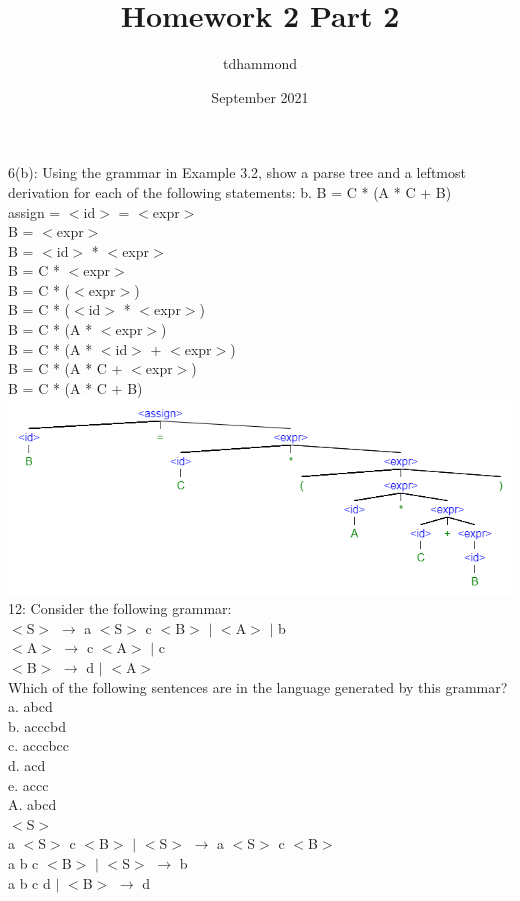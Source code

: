 \documentclass{article}
\title{Homework 2 Part 2}
\author{tdhammond }
\date{September 2021}
\begin{document}
\maketitle

6(b): Using the grammar in Example 3.2, show a parse tree and a leftmost derivation for each of the following statements:
b. B = C * (A * C + B)\\
assign = $<$id$>$ = $<$expr$>$\\
	  B = $<$expr$>$\\
	  B = $<$id$>$ * $<$expr$>$\\
	  B = C * $<$expr$>$\\
	  B = C * ($<$expr$>$)\\
	  B = C * ($<$id$>$ * $<$expr$>$)\\
	  B = C * (A * $<$expr$>$)\\
	  B = C * (A * $<$id$>$ + $<$expr$>$)\\
	  B = C * (A * C + $<$expr$>$)\\
	  B = C * (A * C + B)\\
\includegraphics[scale=.5]{6b.png} \\

12: Consider the following grammar:\\
$<$S$>$ $\rightarrow$ a $<$S$>$ c $<$B$>$ $|$ $<$A$>$ $|$ b\\
$<$A$>$ $\rightarrow$ c $<$A$>$ $|$ c\\
$<$B$>$ $\rightarrow$ d $|$ $<$A$>$\\
Which of the following sentences are in the language generated by this grammar?\\
a. abcd\\
b. acccbd\\
c. acccbcc\\
d. acd\\
e. accc\\

A. abcd\\
$<$S$>$\\
a $<$S$>$ c $<$B$>$ $|$ $<$S$>$ $\rightarrow$ a $<$S$>$ c $<$B$>$\\
a b c $<$B$>$ $|$ $<$S$>$ $\rightarrow$ b\\
a b c d $|$ $<$B$>$ $\rightarrow$ d\\
\end{document}
